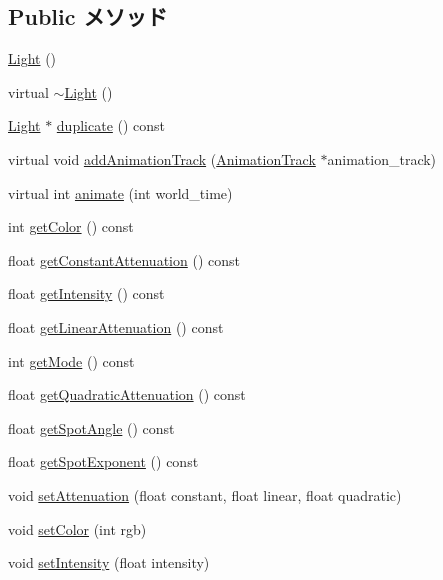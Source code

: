 \subsection*{Public メソッド}
\begin{CompactItemize}
\item 
\hyperlink{classm3g_1_1Light_7f8a7be05225f470c200f7e4ff914a3c}{Light} ()
\item 
virtual \hyperlink{classm3g_1_1Light_f50d3d8cdb323e1a9fbd7bfac3aeba06}{$\sim$Light} ()
\item 
\hyperlink{classm3g_1_1Light}{Light} $\ast$ \hyperlink{classm3g_1_1Light_7a41af040d0c1566358d84f089cd0cd1}{duplicate} () const 
\item 
virtual void \hyperlink{classm3g_1_1Light_415c0b110f95410ded9b85e5d99a496b}{addAnimationTrack} (\hyperlink{classm3g_1_1AnimationTrack}{AnimationTrack} $\ast$animation\_\-track)
\item 
virtual int \hyperlink{classm3g_1_1Light_8aad1ceab4c2a03609c8a42324ce484d}{animate} (int world\_\-time)
\item 
int \hyperlink{classm3g_1_1Light_4cfa1931c265ec3412fe3f6408a1b4f5}{getColor} () const 
\item 
float \hyperlink{classm3g_1_1Light_9553ab96cb7639acafcebb81888af687}{getConstantAttenuation} () const 
\item 
float \hyperlink{classm3g_1_1Light_ca846da41d09a6ae01d6b362c33e938d}{getIntensity} () const 
\item 
float \hyperlink{classm3g_1_1Light_50e949b0cc2014e576987379cac07769}{getLinearAttenuation} () const 
\item 
int \hyperlink{classm3g_1_1Light_d4ce4524e4751fe5e3cfb8c270347d54}{getMode} () const 
\item 
float \hyperlink{classm3g_1_1Light_9ec7130ca1977cfeb4b2cbebc31971b4}{getQuadraticAttenuation} () const 
\item 
float \hyperlink{classm3g_1_1Light_1117f914d754fe74c090dc97bde905eb}{getSpotAngle} () const 
\item 
float \hyperlink{classm3g_1_1Light_a359fee191741efb7e576616a59a76f7}{getSpotExponent} () const 
\item 
void \hyperlink{classm3g_1_1Light_391c5cff137fc2e810f5129a5381196f}{setAttenuation} (float constant, float linear, float quadratic)
\item 
void \hyperlink{classm3g_1_1Light_b1f5cc0f5cc6bbbd716a526c61f1081d}{setColor} (int rgb)
\item 
void \hyperlink{classm3g_1_1Light_ce02325cb6289c007d569c193641c468}{setIntensity} (float intensity)

\end{CompactItemize}
